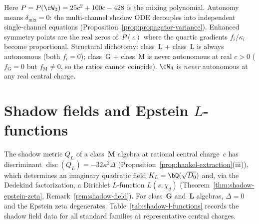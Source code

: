 \noindent
Here $P = P(\cW_3) = 25c^2 + 100c - 428$ is the mixing polynomial.
Autonomy means $\delta_{\mathrm{mix}} = 0$: the multi-channel
shadow ODE decouples into independent single-channel equations
(Proposition~\ref{prop:propagator-variance}).
Enhanced symmetry points are the real zeros of~$P(c)$ where
the quartic gradients $f_i/\kappa_i$ become proportional.
Structural dichotomy: class~L + class~L is always autonomous
(both $f_i = 0$); class~G + class~M is never autonomous at
real $c > 0$ ($f_{\mathrm{G}} = 0$ but $f_{\mathrm{M}} \neq 0$,
so the ratios cannot coincide).
$\cW_4$ is \emph{never} autonomous at any real central charge.


\section*{Shadow fields and Epstein $L$-functions}
\label{sec:shadow-l-functions}

The shadow metric $Q_L$ of a class~$\mathbf{M}$ algebra at
rational central charge~$c$ has discriminant
$\operatorname{disc}(Q_L) = -32\kappa^2\Delta$
(Proposition~\ref{prop:hankel-extraction}(iii)), which determines
an imaginary quadratic field $K_L = \bQ(\sqrt{D_0})$ and,
via the Dedekind factorization, a Dirichlet $L$-function
$L(s, \chi_d)$
(Theorem~\ref{thm:shadow-epstein-zeta},
Remark~\ref{rem:shadow-field}).
For class~$\mathbf{G}$ and~$\mathbf{L}$ algebras,
$\Delta = 0$ and the Epstein zeta degenerates.
Table~\ref{tab:shadow-l-functions} records the shadow field data
for all standard families at representative central charges.

